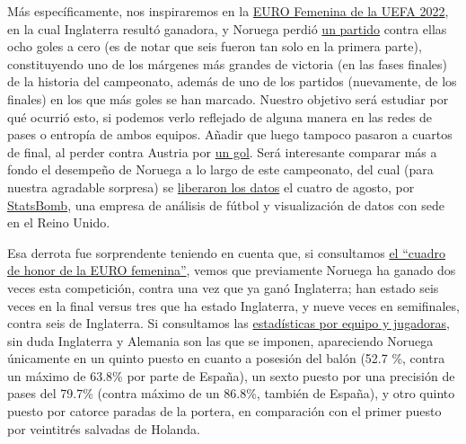 Más específicamente, nos inspiraremos en la 
\href{https://es.uefa.com/womenseuro/news/0258-0e223de64a73-41a64bf308f9-1000--todos-los-resultados/?iv=true}{EURO 
Femenina de la UEFA 2022}, en la cual Inglaterra resultó ganadora, y Noruega perdió 
\href{https://es.uefa.com/womenseuro/match/2032209--england-vs-norway/}{un partido} contra ellas ocho 
goles a cero (es de notar que seis fueron tan solo en la primera parte), constituyendo uno de los márgenes más 
grandes de victoria (en las fases finales) de la historia 
del campeonato, además de uno de los partidos (nuevamente, de los finales) en los que más goles se han marcado. 
Nuestro objetivo será estudiar por qué ocurrió esto, si podemos verlo reflejado de alguna manera 
en las redes de pases o entropía de ambos equipos. Añadir que luego tampoco pasaron a cuartos de final, al perder 
contra Austria por \href{https://es.uefa.com/womenseuro/match/2032211--austria-vs-norway/}{un gol}. Será interesante 
comparar más a fondo el desempeño de Noruega a lo largo de este campeonato, del cual (para nuestra agradable sorpresa) se 
\href{https://statsbomb.com/articles/soccer/statsbomb-release-free-360-data-womens-euro-2022-available-now/}{
liberaron los datos} el cuatro de agosto, por \href{https://statsbomb.com/}{StatsBomb}, una empresa de 
análisis de fútbol y visualización de datos con sede en el Reino Unido.

Esa derrota fue sorprendente teniendo en cuenta que, si consultamos 
\href{https://www.uefa.com/womenseuro/news/023d-0e16a7c86b1c-05ff0a6fb380-1000--uefa-women-s-euro-facts-and-figures-player-records-most-goals-b/}{
el ``cuadro de honor de la EURO femenina''}, vemos que previamente Noruega ha ganado dos veces esta 
competición, contra una vez que ya ganó Inglaterra; han estado seis veces en la final versus tres que ha 
estado Inglaterra, y nueve veces en semifinales, contra seis de Inglaterra. 
Si consultamos las \href{https://www.uefa.com/womenseuro/statistics/}{estadísticas por equipo y jugadoras}, sin 
duda Inglaterra y Alemania son las que se imponen, apareciendo Noruega únicamente en un quinto puesto en cuanto 
a posesión del balón (52.7 \%, contra un máximo de 63.8\% por parte de España), un sexto puesto por una 
precisión de pases del 79.7\% (contra máximo de un 86.8\%, también de España), y otro quinto puesto por catorce paradas 
de la portera, en comparación con el primer puesto por veintitrés salvadas de Holanda. 

